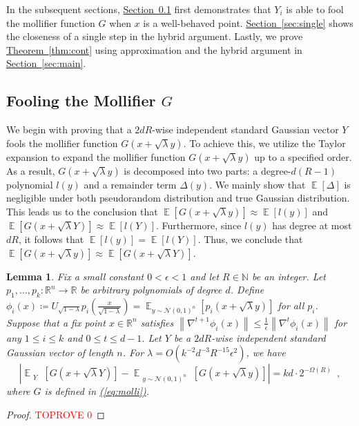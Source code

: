 \documentclass[12pt]{article}
\newtheorem{lemma}[theorem]{Lemma}
\newcommand{\eq}[1]{\hyperref[eq:#1]{(\ref*{eq:#1})}}
\newcommand{\thm}[1]{\hyperref[thm:#1]{Theorem~\ref*{thm:#1}}}
\newcommand{\sect}[1]{\hyperref[sec:#1]{Section~\ref*{sec:#1}}}
\newcommand{\N}{\mathbb{N}}  \newcommand{\R}{\mathbb{R}} \newcommand{\C}{\mathbb{C}} \newcommand{\U}{\mathbb{U}} \renewcommand{\d}{\mathrm{d}} \DeclareMathOperator*{\E}{\mathbb{E}}  \newcommand{\so}{\mathrm{SO}} \newcommand{\s}{\mathrm{S}} \newcommand{\su}{\mathrm{SU}} \renewcommand{\i}{\mathrm{i}} \newcommand{\A}{\mathcal{A}}  \newcommand{\B}{\mathcal{B}} \newcommand{\CC}{\mathcal{C}} \newcommand{\D}{\mathcal{D}} \newcommand{\F}{\mathcal{F}} \renewcommand{\H}{\mathcal{H}} \newcommand{\K}{\mathcal{K}} \newcommand{\NN}{\mathcal{N}} \newcommand{\V}{\mathcal{V}} \newcommand{\X}{\mathcal{X}} \newcommand{\Y}{\mathcal{Y}} \renewcommand{\S}{\mathcal{S}} \newcommand{\SR}{\mathcal{S}_{\R}} \newcommand{\SC}{\mathcal{S}_{\C}} \newcommand{\EE}{\mathcal{E}}  \newcommand{\PP}{\mathcal{P}} \newcommand{\KK}{\widetilde{K}} \newcommand{\LL}{\widetilde{L}} \newcommand{\W}{\widehat{W}} \newcommand{\f}{\hat{f}} \newcommand{\g}{\hat{g}} \newcommand{\h}{\hat{h}} \newcommand{\bit}[1]{\{0,1\}^{#1}} \newcommand{\wrt}{w.r.t.~} \newcommand{\us}{\overset{\$}{\leftarrow}} \newcommand{\set}[1]{\left\{#1\right\}} \newcommand{\lhs}{\mathrm{LHS}} \newcommand{\expec}[1]{\E\!\Br{#1}} \newcommand{\expect}[2]{\E_{\substack{#1}}\!\Br{#2}} \newcommand{\prob}[2]{\underset{#1}{\mathrm{Pr}}\!\Br{#2}} \newcommand{\cf}{\widetilde{f}} \newcommand{\cg}{\widetilde{g}} \newcommand{\ch}{\widetilde{h}} \newcommand{\ck}{\widetilde{K}} \newcommand{\rep}[2]{\br{#1}_{#2}} \newcommand{\AND}[1]{\mathrm{AND}\!\br{#1}}
\newcommand{\grad}[2]{\nabla^{#1}{#2}}
\newcommand{\br}[1]{\left(#1\right)} \newcommand{\Br}[1]{\left[#1\right]} \newcommand{\st}[1]{\left\{#1\right\}} \newcommand{\tr}[1]{\mathrm{Tr}\!\Br{#1}} \newcommand{\abs}[1]{\left|#1 \right|} \newcommand{\norm}[1]{\left\lVert #1 \right\rVert} \newcommand{\agl}[2]{\theta^{\br{#1}}_{#2}} \newcommand{\aglp}[2]{{\theta'}^{\br{#1}}_{#2}} \newcommand{\lint}[1]{\left\lfloor#1\right\rfloor} \newcommand{\poly}[1]{\mathrm{poly}\!\br{#1}} \newcommand{\negl}[1]{\mathrm{negl}\!\br{#1}} \newcommand{\de}[1]{\mathrm{d}#1} \newcommand{\val}[1]{\mathrm{val}\!\br{#1}} \newcommand{\vall}[1]{\mathrm{val}\br{#1}} \newcommand{\nd}[1]{\mathcal{N}\!\br{#1}} \newcommand{\ketbratwo}[2]{\ket{#1} \hspace{-0.4em}\bra{#2}} \newcommand{\ketbra}[1]{\ketbratwo{#1}{#1}} \newcommand{\id}{\ensuremath{\mathds{1}}} \newcommand{\ogroup}[1]{\mathrm{O}\!\br{#1}} \newcommand{\ugroup}[1]{\mathrm{U}\!\br{#1}} \newcommand{\td}{\mathrm{TD}} \newcommand{\tv}[1]{\norm{#1}_{\mathrm{TV}}} \newcommand {\defeq} {\ensuremath{ \stackrel{\mathrm{def}}{=} }} \newcommand{\vdim}{\ensuremath{N}} \newcommand{\dimin}{\ensuremath{n}} \newcommand{\dimout}{\ensuremath{m}} \newcommand{\ncopy}{\ell} \newcommand{\hspacein}{\H_\mathrm{in}} \newcommand{\hspaceout}{\H_\mathrm{out}} \newcommand{\Sin}{\S(\hspacein)} \newcommand{\Sout}{\S(\hspaceout)} \newcommand{\haar}{\ensuremath{\mu}} \newcommand{\tensorhaar}{\ensuremath{\eta}} \newcommand{\tensorsrss}{\ensuremath{\nu}} \newcommand{\qadvice}{\ensuremath{\rho}} \newcommand{\tp}{\otimes} \newcommand{\wone}[2]{W_1\!\br{#1,#2}}
\begin{document}
	In the subsequent sections, \sect{molli} first demonstrates that $Y_i$ is able to fool the mollifier function $G$ when $x$ is a well-behaved point.
	\sect{single} shows the closeness of a single step in the hybrid argument.
	Lastly, we prove \thm{cont} using approximation and the hybrid argument in \sect{main}.
	





\subsection{Fooling the Mollifier $G$} \label{sec:molli}
We begin with proving that a $2dR$-wise independent standard Gaussian vector $Y$
fools the mollifier function $G(x+\sqrt{\lambda}y)$.
To achieve this, we utilize the Taylor expansion to expand
the mollifier function
$G(x+\sqrt{\lambda}y)$ up to a specified order.
As a result, $G(x+\sqrt{\lambda}y)$ is decomposed into two parts:
a degree-$d(R-1)$ polynomial $l(y)$ and a remainder term $\Delta(y)$.
We mainly show that $\E[\Delta]$ is negligible under both
pseudorandom distribution and true Gaussian distribution.
This leads us to the conclusion that
$\E[G(x+\sqrt{\lambda}y)]\approx \E[l(y)]$ and
$\E[G(x+\sqrt{\lambda}Y)]\approx \E[l(Y)]$.
Furthermore, since $l(y)$ has degree at most $dR$,
it follows that $\E[l(y)] = \E[l(Y)]$.
Thus, we conclude that $\E[G(x+\sqrt{\lambda}y)]\approx\E[G(x+\sqrt{\lambda}Y)]$.


\begin{lemma}\label{lem:molli}
		Fix a small constant $0<\epsilon<1$ and let $R\in\N$ be an integer.
		Let $p_1,\dots,p_k:\R^n \to \R$ be arbitrary polynomials of degree $d$.
	Define $\phi_i(x) \coloneq U_{\sqrt{1-\lambda}} p_i\!\br{\frac{x}{\sqrt{1-\lambda}}}=\E_{y\sim\NN\br{0,1}^n}[p_i(x+\sqrt{\lambda}y)]$ for all $p_i$.
Suppose that a fix point $x\in\R^n$ satisfies $ \norm{\grad{t+1}{\phi_i(x)}} \leq \frac{1}{\epsilon}\norm{\grad{t}{\phi_i(x)}}$ for any $1\leq i\leq k$ and $0\leq t\leq d-1$.
	Let $Y$ be a $2dR$-wise independent standard Gaussian vector of length $n$.
	For $\lambda = O(k^{-2}d^{-3}R^{-15}\epsilon^2)$, we have 
	\[
	\abs{
		\expect{Y}{
			G(x+\sqrt{\lambda}Y)
		}
		-
		\expect{y\sim\NN\br{0,1}^n}{
			G(x+\sqrt{\lambda}y)
		}
	} = kd\cdot 2^{-\Omega(R)} \enspace ,
	\]
	where $G$ is defined in \eq{molli}.
	\end{lemma}
	
\begin{proof}\textcolor{red}{TOPROVE 0}\end{proof}	
\end{document}
